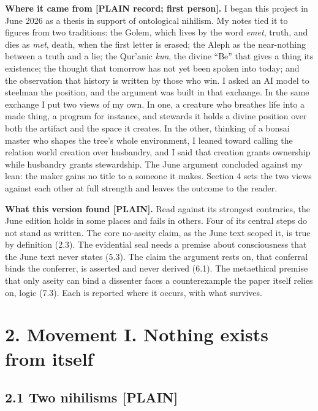 \documentclass[11pt]{article}
\newcommand{\register}[1]{{\ttfamily\small #1}}
\begin{document}
\textbf{Where it came from \register{[PLAIN record; first person]}.} I began this project in June 2026 as a thesis in support of ontological nihilism. My notes tied it to figures from two traditions: the Golem, which lives by the word \emph{emet}, truth, and dies as \emph{met}, death, when the first letter is erased; the Aleph as the near-nothing between a truth and a lie; the Qur'anic \emph{kun}, the divine ``Be'' that gives a thing its existence; the thought that tomorrow has not yet been spoken into today; and the observation that history is written by those who win. I asked an AI model to steelman the position, and the argument was built in that exchange. In the same exchange I put two views of my own. In one, a creature who breathes life into a made thing, a program for instance, and stewards it holds a divine position over both the artifact and the space it creates. In the other, thinking of a bonsai master who shapes the tree's whole environment, I leaned toward calling the relation world creation over husbandry, and I said that creation grants ownership while husbandry grants stewardship. The June argument concluded against my lean: the maker gains no title to a someone it makes. Section 4 sets the two views against each other at full strength and leaves the outcome to the reader.

\textbf{What this version found \register{[PLAIN]}.} Read against its strongest contraries, the June edition holds in some places and fails in others. Four of its central steps do not stand as written. The core no-aseity claim, as the June text scoped it, is true by definition (2.3). The evidential seal needs a premise about consciousness that the June text never states (5.3). The claim the argument rests on, that conferral binds the conferrer, is asserted and never derived (6.1). The metaethical premise that only aseity can bind a dissenter faces a counterexample the paper itself relies on, logic (7.3). Each is reported where it occurs, with what survives.

\section*{2. Movement I. Nothing exists from itself}

\subsection*{2.1 Two nihilisms \register{[PLAIN]}}
\end{document}
